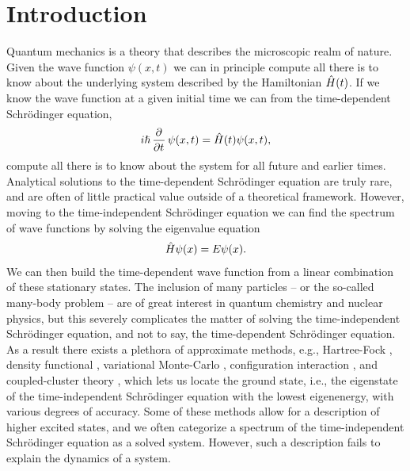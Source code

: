 \chapter{Introduction}
    Quantum mechanics is a theory that describes the microscopic realm of
    nature.
    Given the wave function $\psi(x, t)$ we can in principle compute all there
    is to know about the underlying system described by the Hamiltonian
    $\hat{H}(t)$.
    If we know the wave function at a given initial time we can from the
    time-dependent Schrödinger equation,
    \begin{align}
        i\hslash\dpd{}{t}\psi(x, t) = \hamil(t)\psi(x, t),
    \end{align}
    compute all there is to know about the system for all future and earlier
    times.
    Analytical solutions to the time-dependent Schrödinger equation are truly
    rare, and are often of little practical value outside of a theoretical
    framework.
    However, moving to the time-independent Schrödinger equation we can find the
    spectrum of wave functions by solving the eigenvalue equation
    \begin{align}
        \hat{H}\psi(x) = E\psi(x).
    \end{align}
    We can then build the time-dependent wave function from a linear combination
    of these stationary states.
    The inclusion of many particles -- or the so-called many-body problem -- are
    of great interest in quantum chemistry and nuclear physics, but this
    severely complicates the matter of solving the time-independent Schrödinger
    equation, and not to say, the time-dependent Schrödinger equation.
    As a result there exists a plethora of approximate methods, e.g.,
    Hartree-Fock \cite{hartree_1928, szabo1996modern}, density functional
    \cite{ullrich2011time}, variational Monte-Carlo \cite{hjorth2017advanced},
    configuration interaction \cite{helgaker-molecular}, and coupled-cluster
    theory \cite{coester1958421}, which lets us locate the ground state, i.e.,
    the eigenstate of the time-independent Schrödinger equation with the lowest
    eigenenergy, with various degrees of accuracy.
    Some of these methods allow for a description of higher excited states, and
    we often categorize a spectrum of the time-independent Schrödinger equation
    as a solved system.
    However, such a description fails to explain the dynamics of a system.

